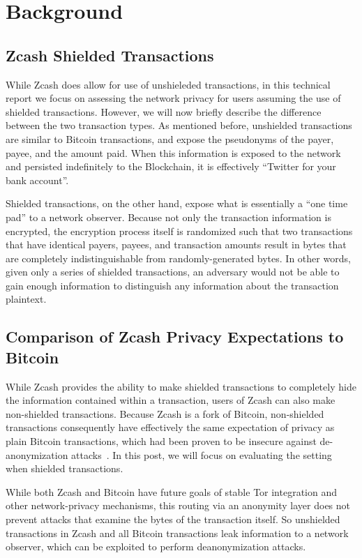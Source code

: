 \documentclass{article}
\begin{document}
\section{Background} \label{background}

\subsection{Zcash Shielded Transactions}
\label{shielded}

While Zcash does allow for use of unshieleded transactions, in this technical
report we focus on assessing the network privacy for users assuming the use of shielded
transactions. However, we will now briefly describe
the difference between the two transaction types.
As mentioned before, unshielded transactions are similar
to Bitcoin transactions, and expose the pseudonyms of the payer, payee, and the
amount paid. When this information is exposed to the network and persisted
indefinitely to the Blockchain, it is effectively “Twitter for your bank
account”.

Shielded transactions, on the other hand, expose what is essentially a “one
time pad” to a network observer. Because not only the transaction information
is encrypted, the encryption process itself is randomized such that two
transactions that have identical payers, payees, and transaction amounts result
in bytes that are completely indistinguishable from randomly-generated bytes.
In other words, given only a series of shielded transactions, an adversary
would not be able to gain enough information to distinguish any information
about the transaction plaintext.


\subsection{Comparison of Zcash Privacy Expectations to Bitcoin}

While Zcash provides the ability to make shielded transactions to completely
hide the information contained within a transaction, users of Zcash can also
make non-shielded transactions. Because Zcash is a fork of Bitcoin,
non-shielded transactions consequently have effectively the same expectation of
privacy as plain Bitcoin transactions, which had been proven to be insecure
against de-anonymization attacks~\cite{anon-bitcoin}. In this post, we will
focus on evaluating the setting when shielded transactions.

While both Zcash and Bitcoin have future goals of
stable Tor integration and other network-privacy mechanisms, this routing via
an anonymity layer does not prevent attacks that examine the bytes of the
transaction itself. So unshielded transactions in Zcash and all Bitcoin
transactions leak information to a network observer, which can be exploited to
perform deanonymization attacks.
\end{document}
